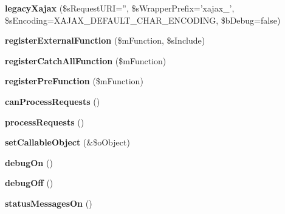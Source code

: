 \begin{DoxyCompactItemize}
\item 
\hypertarget{classlegacyXajax_a1e3f34d459d3c164dd794f9bdd1febad}{
{\bfseries legacyXajax} (\$sRequestURI='', \$sWrapperPrefix='xajax\_\-', \$sEncoding=XAJAX\_\-DEFAULT\_\-CHAR\_\-ENCODING, \$bDebug=false)}
\label{classlegacyXajax_a1e3f34d459d3c164dd794f9bdd1febad}

\item 
\hypertarget{classlegacyXajax_af759c763e51eebba8a07df897cfd9d7e}{
{\bfseries registerExternalFunction} (\$mFunction, \$sInclude)}
\label{classlegacyXajax_af759c763e51eebba8a07df897cfd9d7e}

\item 
\hypertarget{classlegacyXajax_a7b5c9cc18992702ffc2c74b87aae39a1}{
{\bfseries registerCatchAllFunction} (\$mFunction)}
\label{classlegacyXajax_a7b5c9cc18992702ffc2c74b87aae39a1}

\item 
\hypertarget{classlegacyXajax_a8f4bc6b8245e4530b0de2f0dca1b86a2}{
{\bfseries registerPreFunction} (\$mFunction)}
\label{classlegacyXajax_a8f4bc6b8245e4530b0de2f0dca1b86a2}

\item 
\hypertarget{classlegacyXajax_ad56960deae23a926dabe022a68df9611}{
{\bfseries canProcessRequests} ()}
\label{classlegacyXajax_ad56960deae23a926dabe022a68df9611}

\item 
\hypertarget{classlegacyXajax_a9124e388208668bd98bb4dd47451895d}{
{\bfseries processRequests} ()}
\label{classlegacyXajax_a9124e388208668bd98bb4dd47451895d}

\item 
\hypertarget{classlegacyXajax_a8abdfb7bacfeaf036cdd47ea527cb6dc}{
{\bfseries setCallableObject} (\&\$oObject)}
\label{classlegacyXajax_a8abdfb7bacfeaf036cdd47ea527cb6dc}

\item 
\hypertarget{classlegacyXajax_a16e6b7a4dcba4090c04b80793cf98133}{
{\bfseries debugOn} ()}
\label{classlegacyXajax_a16e6b7a4dcba4090c04b80793cf98133}

\item 
\hypertarget{classlegacyXajax_a356429d00c8d1398c5ead7c6aec98f8c}{
{\bfseries debugOff} ()}
\label{classlegacyXajax_a356429d00c8d1398c5ead7c6aec98f8c}

\item 
\hypertarget{classlegacyXajax_a6367c3279076ce0403ef56bcbb2996e4}{
{\bfseries statusMessagesOn} ()}
\label{classlegacyXajax_a6367c3279076ce0403ef56bcbb2996e4}


\end{DoxyCompactItemize}
